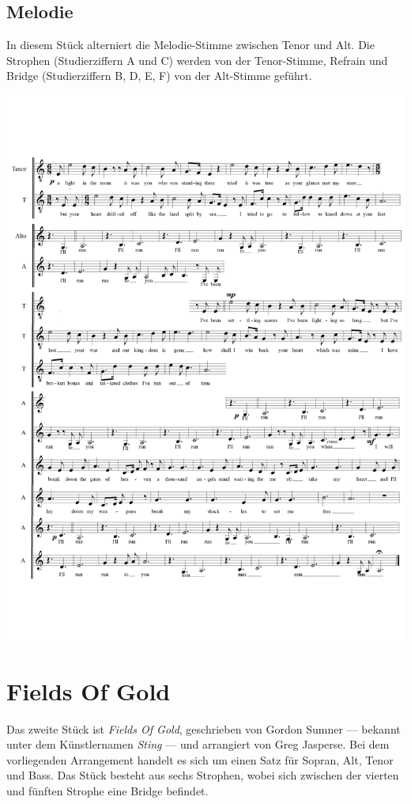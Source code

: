 \subsection*{Melodie}

In diesem Stück alterniert die Melodie-Stimme zwischen Tenor und Alt. Die Strophen (Studierziffern A und C) werden von der Tenor-Stimme, Refrain und Bridge (Studierziffern B, D, E, F) von der Alt-Stimme geführt.

\includegraphics[width=\textwidth]{resources/arrangements/Run To You - Melody.png}
\label{appendix:Run To You}
 

\section{Fields Of Gold}

Das zweite Stück ist \textit{Fields Of Gold}, geschrieben von Gordon Sumner — bekannt unter dem Künstlernamen \textit{Sting} — und arrangiert von Greg Jasperse. Bei dem vorliegenden Arrangement handelt es sich um einen Satz für Sopran, Alt, Tenor und Bass. Das Stück besteht aus sechs Strophen, wobei sich zwischen der vierten und fünften Strophe eine Bridge befindet.

